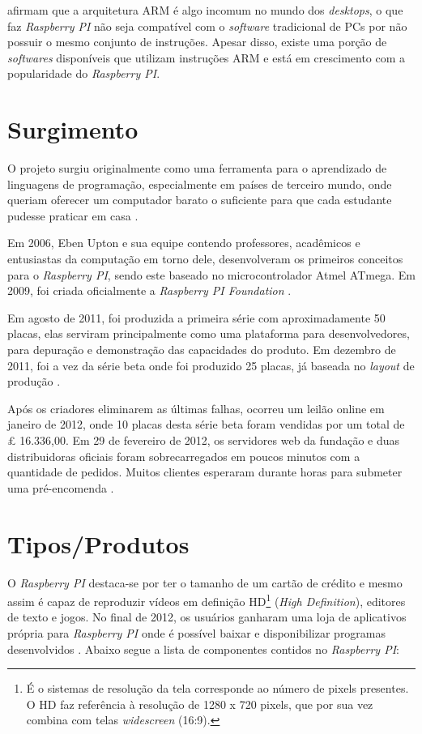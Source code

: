 \documentclass[
	12pt,				%
	openright,			%
	twoside,			%
	a4paper,			%
	chapter=TITLE,		%
	english,			%
	brazil				%
	]{abntex2}
\begin{document}
 afirmam que a arquitetura ARM é algo incomum no mundo dos \textit{desktops}, o que faz \textit{Raspberry PI} não seja compatível com o \textit{software} tradicional de PCs por não possuir o mesmo conjunto de instruções. Apesar disso, existe uma porção de \textit{softwares} disponíveis que utilizam instruções ARM e está em crescimento com a popularidade do \textit{Raspberry PI}.


\section{Surgimento}

O projeto surgiu originalmente como uma ferramenta para o aprendizado de linguagens de programação, especialmente em países de terceiro mundo, onde queriam oferecer um computador barato o suficiente para que cada estudante pudesse praticar em casa \cite{ClubeHardware}.

Em 2006, Eben Upton e sua equipe contendo professores, acadêmicos e entusiastas da computação em torno dele, desenvolveram os primeiros conceitos para o \textit{Raspberry PI}, sendo este baseado no microcontrolador Atmel ATmega. Em 2009, foi criada oficialmente a \textit{Raspberry PI Foundation} \cite{eben2013raspberry}. 

Em agosto de 2011, foi produzida a primeira série com aproximadamente 50 placas, elas serviram principalmente como uma plataforma para desenvolvedores, para depuração e demonstração das capacidades do produto. Em dezembro de 2011, foi a vez da série beta onde foi produzido 25 placas, já baseada no \textit{layout} de produção \cite{Werner.Raspberry}.

Após os criadores eliminarem as últimas falhas, ocorreu um leilão online em janeiro de 2012, onde 10 placas desta série beta foram vendidas por um total de £ 16.336,00. Em 29 de fevereiro de 2012, os servidores web da fundação e duas distribuidoras oficiais foram sobrecarregados em poucos minutos com a quantidade de pedidos. Muitos clientes esperaram durante horas para submeter uma pré-encomenda \cite{Werner.Raspberry}.


\section{Tipos/Produtos}


O \textit{Raspberry PI} destaca-se por ter o tamanho de um cartão de crédito e mesmo assim é capaz de reproduzir vídeos em definição HD\footnote{É o sistemas de resolução da tela corresponde ao número de pixels presentes. O HD faz referência à resolução de 1280 x 720 pixels, que por sua vez combina com telas \textit{widescreen} (16:9).} (\textit{High Definition}), editores de texto e jogos. No final de 2012, os usuários ganharam uma loja de aplicativos própria para \textit{Raspberry PI} onde é possível baixar e disponibilizar programas desenvolvidos \cite{revistagalileu}. Abaixo segue a lista de componentes contidos no \textit{Raspberry PI}:
\end{document}
